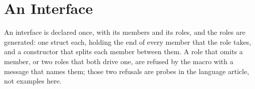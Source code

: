 \section{An Interface}
\label{sec:x-interface}

An interface is declared once, with its members and its roles, and
the roles are generated: one struct each, holding the end of every
member that the role takes, and a constructor that splits each member
between them. A role that omits a member, or two roles that both drive
one, are refused by the macro with a message that names them; those
two refusals are probes in the language article, not examples here.


